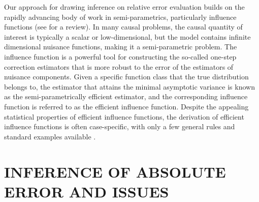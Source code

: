 \documentclass[twoside]{article}
\newcommand{\1}{{\mathbbm{1}}}
\begin{document}
Our approach for drawing inference on relative error evaluation builds on the rapidly advancing body of work in semi-parametrics, particularly influence functions \parencite{van2000asymptotic, robins2008higher} (see \cite{kennedy2022semiparametric} for a review).  
In many causal problems, the causal quantity of interest is typically a scalar or low-dimensional, but the model contains infinite dimensional nuisance functions, making it a semi-parametric problem.
The influence function is a powerful tool for constructing the so-called one-step correction estimators that is more robust to the error of the estimators of nuisance components.
Given a specific function class that the true distribution belongs to, the estimator that attains the minimal asymptotic variance is known as the semi-parametrically efficient estimator, and the corresponding influence function is referred to as the efficient influence function. Despite the appealing statistical properties of efficient influence functions, the derivation of efficient influence functions is often case-specific, with only a few general rules and standard examples available \parencite{kennedy2022semiparametric}.



\section{INFERENCE OF ABSOLUTE ERROR AND ISSUES}\label{sec:absolute.error}

\end{document}
